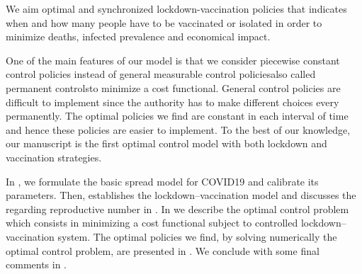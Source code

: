     We aim optimal and synchronized lockdown-vaccination 
policies that indicates when and how many people 
have to be vaccinated or isolated in order to minimize 
deaths, infected prevalence and economical impact.


   One of the main features of our model is that we consider piecewise
constant control policies instead of general measurable control 
policies\textemdash also called permanent controls\textemdash to minimize a cost 
functional. General control policies are difficult to implement since the 
authority has to make different choices every permanently. The optimal policies 
we find are constant in each interval of time and hence these policies are 
easier to implement. To the best of our knowledge, our manuscript is the first 
optimal control model with both lockdown and vaccination strategies. 





In , we formulate the
basic spread model for COVID19 and calibrate its parameters. Then,
 establishes the lockdown--vaccination model and
discusses the regarding reproductive number in
. 
In  we describe the optimal control problem 
which consists in minimizing a cost functional subject to controlled 
lockdown--vaccination system. The optimal policies we find, by solving 
numerically the optimal control problem, are presented in 
. We conclude with some final comments in 
.

